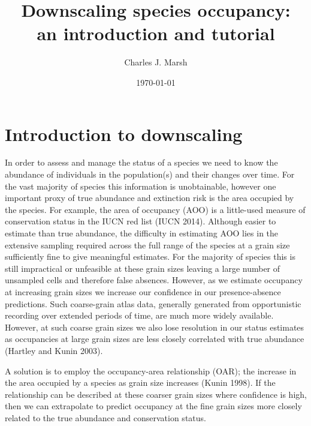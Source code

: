 \documentclass{article}[12pt, a4paper]
\begin{document}



\title{Downscaling species occupancy: \\ an introduction and tutorial}
\author{Charles J. Marsh}
\date{\today}
\maketitle
\tableofcontents

\newpage
\section{Introduction to downscaling}

In order to assess and manage the status of a species we need to know the abundance of individuals in the population(s) and their changes over time. For the vast majority of species this information is unobtainable, however one important proxy of true abundance and extinction risk is the area occupied by the species. For example, the area of occupancy (AOO) is a little-used measure of conservation status in the IUCN red list (IUCN 2014). Although easier to estimate than true abundance, the difficulty in estimating AOO lies in the extensive sampling required across the full range of the species at a grain size sufficiently fine to give meaningful estimates. For the majority of species this is still impractical or unfeasible at these grain sizes leaving a large number of unsampled cells and therefore false absences. However, as we estimate occupancy at increasing grain sizes we increase our confidence in our presence-absence predictions. Such coarse-grain atlas data, generally generated from opportunistic recording over extended periods of time, are much more widely available. However, at such coarse grain sizes we also lose resolution in our status estimates as occupancies at large grain sizes are less closely correlated with true abundance (Hartley and Kunin 2003).

A solution is to employ the occupancy-area relationship (OAR); the increase in the  area occupied by a species as grain size increases (Kunin 1998). If the relationship can be described at these coarser grain sizes where confidence is high, then we can extrapolate to predict occupancy at the fine grain sizes more closely related to the true abundance and conservation status.
\end{document}
